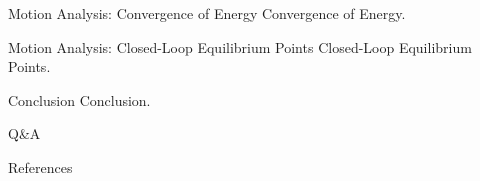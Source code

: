 \documentclass[10pt]{beamer}
\begin{document}
  \begin{frame}{Motion Analysis: Convergence of Energy}
    Convergence of Energy.
  \end{frame}

  \begin{frame}{Motion Analysis: Closed-Loop Equilibrium Points}
    Closed-Loop Equilibrium Points.
  \end{frame}

  \begin{frame}{Conclusion}
    Conclusion.
  \end{frame}

  \begin{frame}[standout]
  	Q\&A
  \end{frame}

  \appendix

  \begin{frame}{References}
  	
    
  \end{frame}
\end{document}
